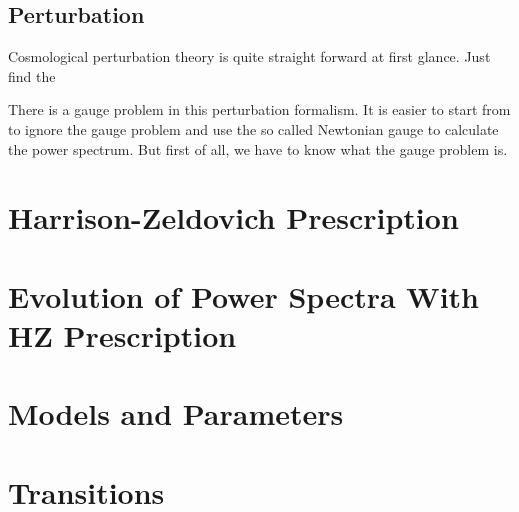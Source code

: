 \documentclass[12pt,a4paper]{book}
\begin{document}
\subsection{Perturbation}

Cosmological perturbation theory is quite straight forward at first glance. Just find the 

There is a gauge problem in this perturbation formalism. It is easier to start from to ignore the gauge problem and use the so called Newtonian gauge to calculate the power spectrum. But first of all, we have to know what the gauge problem is.











\section{Harrison-Zeldovich Prescription}






\section{Evolution of Power Spectra With HZ Prescription}





\section{Models and Parameters}




\section{Transitions}
\end{document}
